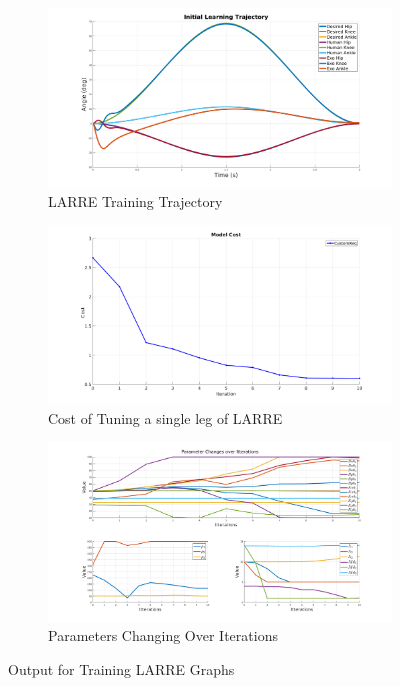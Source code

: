 \begin{figure}
    \centering
    \begin{subfigure}[b]{\textwidth}
        \centering
        \includegraphics[width=0.8\columnwidth]{images/controllers/trajs/init_traj.png}
        \caption[LARRE Training Trajectory]{LARRE Training Trajectory}
        \label{fig:LARRE_Train_Trajectory}
    \end{subfigure}
    
    \begin{subfigure}[b]{\textwidth}
        \centering
        \includegraphics[width=0.8\columnwidth]{images/controllers/trajs/cost.png}
        \caption[LARRE Cost Optimization]{Cost of Tuning a single leg of LARRE}
        \label{fig:LARRE_TUNING}
    \end{subfigure}
  
    \begin{subfigure}[b]{\textwidth}
        \centering
        \includegraphics[width=0.8\columnwidth]{images/controllers/trajs/params_splite.png}
        \caption[LARRE Parameters Optimization]{Parameters Changing Over Iterations}
        \label{fig:LARRE_PARAMS}
    \end{subfigure}

    \caption{Output for Training LARRE Graphs}
    \label{fig:traj_training_graph}
\end{figure}


